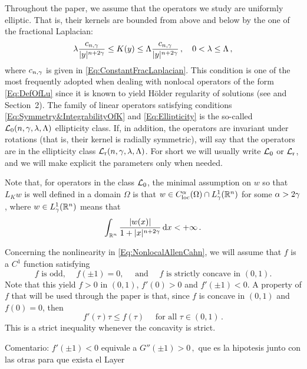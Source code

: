 Throughout the paper, we assume that the operators we study are uniformly elliptic. That is, their kernels are bounded from above and below by the one of the fractional Laplacian:
\begin{equation}
\label{Eq:Ellipticity}
\lambda\dfrac{c_{n,\gamma}}{|y|^{n+2\gamma}} \leq K(y) \leq \Lambda \dfrac{c_{n,\gamma}}{|y|^{n+2\gamma}}\,, \quad 0< \lambda \leq \Lambda \,,
\end{equation}
where $c_{n,\gamma}$ is given in \eqref{Eq:ConstantFracLaplacian}. This condition is one of the most frequently adopted when dealing with nonlocal operators of the form \eqref{Eq:DefOfLu} since it is known to yield Hölder regularity of solutions (see \cite{RosOton-Survey,SerraC2s+alphaRegularity} and Section~2). The family of linear operators satisfying conditions \eqref{Eq:Symmetry&IntegrabilityOfK} and \eqref{Eq:Ellipticity} is the so-called $\mathcal{L}_0(n,\gamma,\lambda, \Lambda)$ ellipticity class. If, in addition, the operators are invariant under rotations (that is, their kernel is radially symmetric), will say that the operators are in the ellipticity class $\mathcal{L}_{\mathrm{r}}(n,\gamma,\lambda, \Lambda)$. For short we will usually write $\mathcal{L}_0$ or $\mathcal{L}_{\mathrm{r}}$, and we will make explicit the parameters only when needed.

Note that, for operators in the class $\mathcal{L}_0$, the minimal assumption on $w$ so that $L_K w$ is well defined in a domain $\Omega$ is that $w\in C^\alpha_{\mathrm{loc}} (\Omega)\cap L^1_\gamma(\mathbb{R}^n)$ for some $\alpha > 2\gamma$, where $w\in L^1_\gamma(\mathbb{R}^n)$ means that
$$
\int_{\mathbb{R}^n} \dfrac{|w(x)|}{1+|x|^{n+2\gamma}}\,\mathrm{d} x < +\infty\,.
$$


Concerning the nonlinearity in \eqref{Eq:NonlocalAllenCahn}, we will assume that $f$ is a $C^1$ function satisfying
\begin{equation}
\label{Eq:Hypothesesf}
f \textrm{ is odd, } \quad f(\pm 1)=0, \quad \text{ and } \quad f \textrm{ is strictly concave in }  (0,1).
\end{equation}
Note that this yield $f>0$ in $(0,1)$, $f'(0)>0$ and $f'(\pm 1) < 0$. A property of $f$ that will be used through the paper is that, since $f$ is concave in $(0,1)$ and $f(0)=0$, then 
\begin{equation}
\label{Eq:PropertyConcavityf}
f'(\tau)\tau \leq f(\tau) \quad \textrm{ for all } \tau \in (0,1)\,.
\end{equation}
This is a strict inequality whenever the concavity is strict.



Comentario: $f'(\pm 1) < 0$ equivale a $G''(\pm 1) > 0\,,$ que es la hipotesis junto con las otras para que exista el Layer

